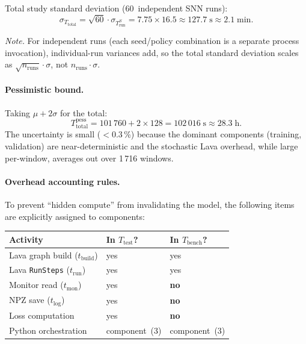 \documentclass[11pt,a4paper]{article}
\begin{document}
Total study standard deviation (60~independent SNN runs):
\begin{equation}\label{eq:tb-sigma-total}
  \sigma_{T_{\text{total}}}
    = \sqrt{60} \cdot \sigma_{T_{\text{run}}^{S}}
    = 7.75 \times 16.5
    \approx 127.7\;\text{s}
    \approx 2.1\;\text{min}.
\end{equation}

\noindent\emph{Note.}
For independent runs (each seed/policy combination is a separate
process invocation), individual-run variances add, so the total
standard deviation scales as $\sqrt{n_{\text{runs}}} \cdot \sigma$,
not $n_{\text{runs}} \cdot \sigma$.

\paragraph{Pessimistic bound.}
Taking $\mu + 2\sigma$ for the total:
\begin{equation}\label{eq:tb-pessimistic}
  T_{\text{total}}^{\text{pess}}
    = 101\,760 + 2 \times 128
    = 102\,016\;\text{s}
    \approx 28.3\;\text{h}.
\end{equation}
The uncertainty is small ($< 0.3$\,\%) because
the dominant components (training, validation) are near-deterministic
and the stochastic Lava overhead, while large per-window,
averages out over 1\,716 windows.

\paragraph{Overhead accounting rules.}
To prevent ``hidden compute'' from invalidating the model, the
following items are explicitly assigned to components:

\begin{center}
\renewcommand{\arraystretch}{1.10}
\begin{tabular}{@{}p{4.5cm}ll@{}}
\toprule
\textbf{Activity} & \textbf{In $T_{\text{test}}$?}
  & \textbf{In $T_{\text{bench}}$?} \\
\midrule
Lava graph build ($t_{\text{build}}$)
  & yes & yes \\
Lava \texttt{RunSteps} ($t_{\text{run}}$)
  & yes & yes \\
Monitor read ($t_{\text{mon}}$)
  & yes & \textbf{no} \\
NPZ save ($t_{\text{log}}$)
  & yes & \textbf{no} \\
Loss computation
  & yes & \textbf{no} \\
Python orchestration
  & component~(3) & component~(3) \\
\bottomrule
\end{tabular}
\end{center}
\end{document}
